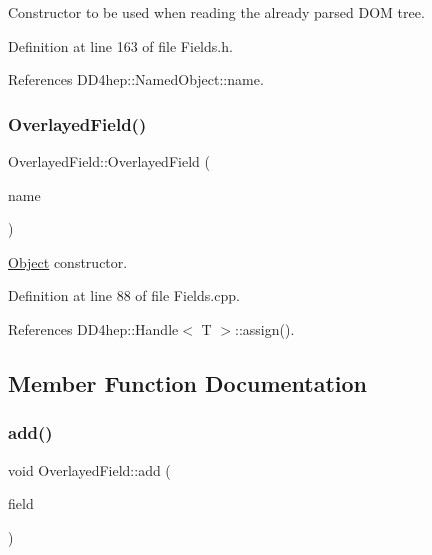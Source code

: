 Constructor to be used when reading the already parsed D\+OM tree. 



Definition at line 163 of file Fields.\+h.



References D\+D4hep\+::\+Named\+Object\+::name.

\hypertarget{class_d_d4hep_1_1_geometry_1_1_overlayed_field_a44b36c5b9d0bdbfd94560b1a663675d4}{}\label{class_d_d4hep_1_1_geometry_1_1_overlayed_field_a44b36c5b9d0bdbfd94560b1a663675d4} 
\subsubsection{\texorpdfstring{Overlayed\+Field()}{OverlayedField()}\hspace{0.1cm}{\footnotesize\ttfamily [3/3]}}
{\footnotesize\ttfamily Overlayed\+Field\+::\+Overlayed\+Field (\begin{DoxyParamCaption}\item[{const std\+::string \&}]{name }\end{DoxyParamCaption})}



\hyperlink{class_d_d4hep_1_1_geometry_1_1_overlayed_field_1_1_object}{Object} constructor. 



Definition at line 88 of file Fields.\+cpp.



References D\+D4hep\+::\+Handle$<$ T $>$\+::assign().



\subsection{Member Function Documentation}
\hypertarget{class_d_d4hep_1_1_geometry_1_1_overlayed_field_a035b1481dfc0a04b37a31795e3df0ba2}{}\label{class_d_d4hep_1_1_geometry_1_1_overlayed_field_a035b1481dfc0a04b37a31795e3df0ba2} 
\subsubsection{\texorpdfstring{add()}{add()}}
{\footnotesize\ttfamily void Overlayed\+Field\+::add (\begin{DoxyParamCaption}\item[{\hyperlink{class_d_d4hep_1_1_geometry_1_1_cartesian_field}{Cartesian\+Field}}]{field }\end{DoxyParamCaption})}



